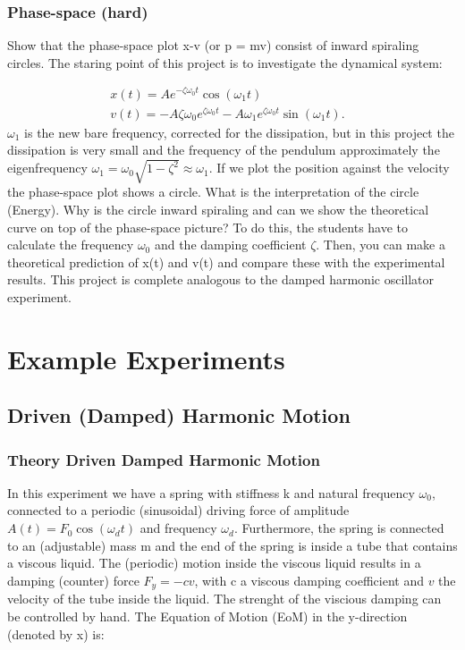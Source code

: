\documentclass{article}
\begin{document}
\subsubsection{Phase-space (hard)}    
Show that the phase-space plot x-v (or p = mv) consist of inward spiraling circles. The staring point of this project is to investigate the dynamical system:

\begin{align}
    x(t) = Ae^{-\zeta\omega_0t}\cos(\omega_1 t) & \\
    v(t) = -A \zeta \omega_0 e^{\zeta \omega_0 t} - A \omega_1e^{\zeta \omega_0 t}\sin(\omega_1 t).
\end{align}
$\omega_1$ is the new bare frequency, corrected for the dissipation, but in this project the dissipation is very small and the frequency of the pendulum approximately the eigenfrequency $\omega_1 =\omega_0\sqrt{1-\zeta^2}\approx \omega_1$. 
If we plot the position against the velocity the phase-space plot shows a circle. What is the interpretation of the circle (Energy). Why is the circle inward spiraling and can we show the theoretical curve on top of the phase-space picture? To do this, the students have to calculate the frequency $\omega_0$ and the damping coefficient $\zeta$. Then, you can make a theoretical prediction of x(t) and v(t) and compare these with the experimental results. This project is complete analogous to the damped harmonic oscillator experiment.

\newpage


\section{Example Experiments}

\subsection{Driven (Damped) Harmonic Motion}
\subsubsection{Theory Driven Damped Harmonic Motion}
In this experiment we have a spring with stiffness k and natural frequency $\omega_0$, connected to a periodic (sinusoidal) driving force of amplitude $A(t) = F_0\cos(\omega_d t)$ and frequency $\omega_d$. Furthermore, the spring is connected to an (adjustable) mass m and the end of the spring is inside a tube that contains a viscous liquid. The (periodic) motion inside the viscous liquid results in a damping (counter) force $F_y = -cv$, with c a viscous damping coefficient and $v$ the velocity of the tube inside the liquid. The strenght of the viscious damping can be controlled by hand. The Equation of Motion (EoM) in the y-direction (denoted by x) is:
\end{document}
